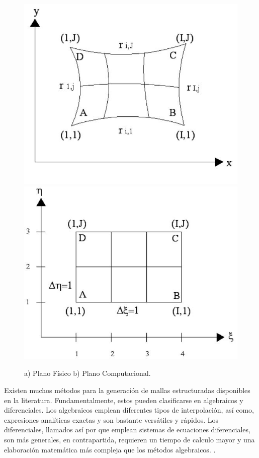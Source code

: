 \documentclass[11pt,letterpaper]{article}
\begin{document}
\begin{figure}[H]
	\centering
	\includegraphics[scale=0.31]{./imgs/planoFisico.jpg}
	\includegraphics[scale=0.31]{./imgs/planoComputacional.jpg}
	\caption{a) Plano F\'isico b) Plano Computacional.}
\end{figure}

Existen muchos métodos para la generación de mallas estructuradas disponibles en la literatura. Fundamentalmente, estos pueden clasificarse en algebraicos y diferenciales. Los algebraicos emplean diferentes tipos de interpolación, así como, expresiones analíticas exactas y son bastante versátiles y rápidos. Los diferenciales, llamados así por que emplean sistemas de ecuaciones diferenciales, son más generales, en contrapartida, requieren un tiempo de calculo mayor y una elaboración matemática más compleja que los métodos algebraicos. 
.
\end{document}
